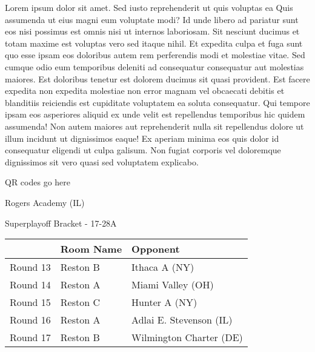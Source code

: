 \documentclass{article}%
\begin{document}
\vspace*{8pt}%
\linebreak%
\newline%
\newline%
Lorem ipsum dolor sit amet. Sed iusto reprehenderit ut quis voluptas ea Quis assumenda ut eius magni eum voluptate modi? Id unde libero ad pariatur sunt eos nisi possimus est omnis nisi ut internos laboriosam. Sit nesciunt ducimus et totam maxime est voluptas vero sed itaque nihil. Et expedita culpa et fuga sunt quo esse ipsam eos doloribus autem rem perferendis modi et molestiae vitae.\newline%
\newline%
Sed cumque odio eum temporibus deleniti ad consequatur consequatur aut molestias maiores. Est doloribus tenetur est dolorem ducimus sit quasi provident. Est facere expedita non expedita molestiae non error magnam vel obcaecati debitis et blanditiis reiciendis est cupiditate voluptatem ea soluta consequatur. Qui tempore ipsam eos asperiores aliquid ex unde velit est repellendus temporibus hic quidem assumenda!\newline%
\newline%
Non autem maiores aut reprehenderit nulla sit repellendus dolore ut illum incidunt ut dignissimos eaque! Ex aperiam minima eos quis dolor id consequatur eligendi ut culpa galisum. Non fugiat corporis vel doloremque dignissimos sit vero quasi sed voluptatem explicabo.\newline%
\newline%
%
\vspace*{30pt}%
\begin{center}%
\begin{Huge}%
QR codes go here%
\end{Huge}%
\end{center}%
\newpage%
\begin{center}%
\begin{Huge}%
Rogers Academy (IL)%
\end{Huge}%
\vspace*{8pt}%
\linebreak%
\begin{Large}%
Superplayoff Bracket {-} 17{-}28A%
\end{Large}%
\end{center}%
%
\begin{tabularx}{\textwidth}{|c|Y|Y|}%
\hline%
&Room Name&Opponent\\%
\hline%
Round 13&Reston B&Ithaca A (NY)\\%
Round 14&Reston A&Miami Valley (OH)\\%
Round 15&Reston C&Hunter A (NY)\\%
Round 16&Reston A&Adlai E. Stevenson (IL)\\%
Round 17&Reston B&Wilmington Charter (DE)\\%
\hline%
\end{tabularx}%
\end{document}
